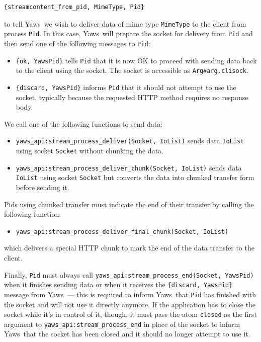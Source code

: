 \documentclass[11pt,oneside,english]{book}
\newcommand{\Yaws}            %
        {{\sc Yaws}}
\begin{document}
\begin{verbatim}
{streamcontent_from_pid, MimeType, Pid}
\end{verbatim}

\noindent to tell \Yaws\ we wish to deliver data of mime type
\verb+MimeType+ to the client from process \verb+Pid+. In this case,
\Yaws\ will prepare the socket for delivery from \verb+Pid+ and then
send one of the following messages to \verb+Pid+:
\begin{itemize}
\item \verb+{ok, YawsPid}+ tells \verb+Pid+ that it is now OK to
  proceed with sending data back to the client using the socket. The
  socket is accessible as \verb+Arg#arg.clisock+.

\item \verb+{discard, YawsPid}+ informs \verb+Pid+ that it should not
  attempt to use the socket, typically because the requested HTTP
  method requires no response body.
\end{itemize}

We call one of the following functions to send data:
\begin{itemize}
\item \verb+yaws_api:stream_process_deliver(Socket, IoList)+ sends
  data \verb+IoList+ using socket \verb+Socket+ without chunking the
  data.

\item \verb+yaws_api:stream_process_deliver_chunk(Socket, IoList)+
  sends data \verb+IoList+ using socket \verb+Socket+ but converts
  the data into chunked transfer form before sending it.
\end{itemize}

Pids using chunked transfer must indicate the end of their transfer by
calling the following function:
\begin{itemize}
\item \verb+yaws_api:stream_process_deliver_final_chunk(Socket, IoList)+
\end{itemize}

which delivers a special HTTP chunk to mark the end of the data
transfer to the client.

Finally, \verb+Pid+ must always call
\verb+yaws_api:stream_process_end(Socket, YawsPid)+ when it finishes
sending data or when it receives the \verb+{discard, YawsPid}+ message
from \Yaws\ --- this is required to inform \Yaws\ that \verb+Pid+ has
finished with the socket and will not use it directly anymore. If the
application has to close the socket while it's in control of it,
though, it must pass the atom \verb+closed+ as the first argument to
\verb+yaws_api:stream_process_end+ in place of the socket to inform
\Yaws\ that the socket has been closed and it should no longer attempt
to use it.
\end{document}

